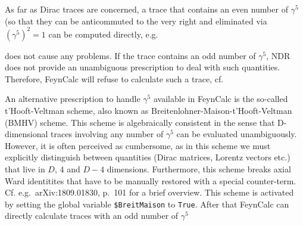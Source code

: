 \documentclass[../FeynCalcManual.tex]{subfiles}
\begin{document}
As far as Dirac traces are concerned, a trace that contains an even
number of \(\gamma^5\) (so that they can be anticommuted to the very
right and eliminated via \((\gamma^5)^2 = 1\) can be computed directly,
e.g.

\begin{Shaded}
\begin{Highlighting}[]
\OperatorTok{[}\OperatorTok{[}\OperatorTok{[}\OperatorTok{,}\OperatorTok{,}\OperatorTok{,}\OperatorTok{]}\OperatorTok{[}\OperatorTok{]}\OperatorTok{[}\OperatorTok{,}\OperatorTok{]}\OperatorTok{[}\OperatorTok{]]]}
\end{Highlighting}
\end{Shaded}

does not cause any problems. If the trace contains an odd number of
\(\gamma^5\), NDR does not provide an unambiguous prescription to deal
with such quantities. Therefore, FeynCalc will refuse to calculate such
a trace, cf.

\begin{Shaded}
\begin{Highlighting}[]
\OperatorTok{[}\OperatorTok{[}\OperatorTok{[}\OperatorTok{,}\OperatorTok{,}\OperatorTok{,}\OperatorTok{]}\OperatorTok{[}\OperatorTok{]]]}
\end{Highlighting}
\end{Shaded}

An alternative prescription to handle \(\gamma^5\) available in FeynCalc
is the so-called t'Hooft-Veltman scheme, also known as
Breitenlohner-Maison-t'Hooft-Veltman (BMHV) scheme. This scheme is
algebraically consistent in the sense that D-dimensional traces
involving any number of \(\gamma^5\) can be evaluated unambiguously.
However, it is often perceived as cumbersome, as in this scheme we must
explicitly distinguish between quantities (Dirac matrices, Lorentz
vectors etc.) that live in \(D\), \(4\) and \(D-4\) dimensions.
Furthermore, this scheme breaks axial Ward identitites that have to be
manually restored with a special counter-term. Cf.
e.g.~arXiv:1809.01830, p.~101 for a brief overview. This scheme is
activated by setting the global variable \texttt{\$BreitMaison} to
\texttt{True}. After that FeynCalc can directly calculate traces with an
odd number of \(\gamma^5\)
\end{document}
